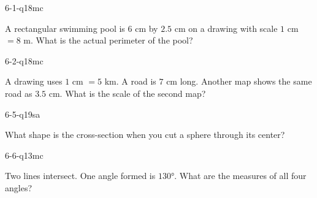 \begin{practiceQuestion}{6-1-q18}{mc}
\begin{questionText}
A rectangular swimming pool is $6$ cm by $2.5$ cm on a drawing with scale $1$ cm $= 8$ m. What is the actual perimeter of the pool?
\end{questionText}
\end{practiceQuestion}

\begin{practiceQuestion}{6-2-q18}{mc}
\begin{questionText}
A drawing uses $1$ cm $= 5$ km. A road is $7$ cm long. Another map shows the same road as $3.5$ cm. What is the scale of the second map?
\end{questionText}
\end{practiceQuestion}

\begin{practiceQuestion}{6-5-q19}{sa}
\begin{questionText}
What shape is the cross-section when you cut a sphere through its center?
\end{questionText}
\end{practiceQuestion}

\begin{practiceQuestion}{6-6-q13}{mc}
\begin{questionText}
Two lines intersect. One angle formed is $130°$. What are the measures of all four angles?
\end{questionText}
\end{practiceQuestion}


